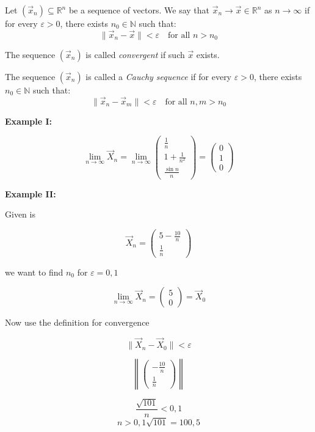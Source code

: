 Let \( (\vec{x}_n) \subseteq \mathbb{R}^n \) be a sequence of vectors. We say that \( \vec{x}_n \to \vec{x} \in \mathbb{R}^n \) as \( n \to \infty \) if for every \( \varepsilon > 0 \), there exists \( n_0 \in \mathbb{N} \) such that:
\[
\|\vec{x}_n - \vec{x}\| < \varepsilon \quad \text{for all } n > n_0
\]

The sequence \( (\vec{x}_n) \) is called \emph{convergent} if such \( \vec{x} \) exists.

The sequence \( (\vec{x}_n) \) is called a \emph{Cauchy sequence} if for every \( \varepsilon > 0 \), there exists \( n_0 \in \mathbb{N} \) such that:
\[
\|\vec{x}_n - \vec{x}_m\| < \varepsilon \quad \text{for all } n, m > n_0
\]

\textbf{Example I:}

\[
\lim_{n \to \infty} \vec{X}_n = \lim_{n \to \infty} \begin{pmatrix} \frac{1}{n} \\
1 + \frac{1}{n^2} \\ \frac{\sin n}{n}\end{pmatrix} = \begin{pmatrix}
    0 \\ 1 \\ 0
\end{pmatrix}
\]

\textbf{Example II:}
\vspace{\baselineskip}

Given is

\[
\vec{X}_n = 
\begin{pmatrix}
5 - \frac{10}{n}\\
\frac{1}{n}   
\end{pmatrix}
\]

we want to find \(n_0\) for \(\varepsilon = 0,1\)

\[
\lim_{n \to \infty} \vec{X}_n = 
\begin{pmatrix}
5 \\
0
\end{pmatrix}
= \vec{X}_0
\]

Now use the definition for convergence

\[
\|\vec{X}_n - \vec{X}_0\| < \varepsilon
\]

\[
\left\| 
\begin{pmatrix}
    -\frac{10}{n}\\
    \frac{1}{n}
\end{pmatrix}
\right\|
\]

\[
\frac{\sqrt{101}}{n} < 0,1
\]
\[
n > 0,1 \sqrt{101} = 100,5
\]


